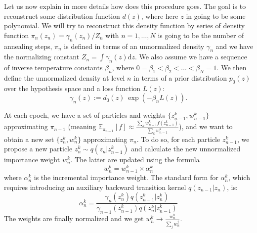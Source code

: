 \documentclass[11pt,a4paper]{article}
\begin{document}
		Let us now explain in more details how does this procedure goes. The goal is to reconstruct some distribution function $d(z)$, where here $z$ in going to be some polynomial. We will try to reconstruct this density function by series of density function $\pi_n(z_n) = \gamma_n(z_n)/Z_n$ with $n = 1,\dots,N$ is going to be the number of annealing steps, $\pi_n$ is defined in terms of an unnormalized density $\gamma_n$ and we have the normalizing constant $Z_n = \int \gamma_n(z) \mathrm{d}z$. We also assume we have a sequence of inverse temperature constants $\beta_n$, where $0 = \beta_1 < \beta_2 <\dots< \beta_N = 1$. We then define the unnormalized density at level $n$ in terms of a prior distribution $p_0(z)$ over the hypothesis space and a loss function $L(z)$:
		\begin{equation}\label{eq:gamman}
			\gamma_n(z) := d_0(z) \: \exp \left( -\beta_n L(z) \right).
		\end{equation} 
		
		At each epoch, we have a set of particles and weights $\{z_{n-1}^k, w_{n-1}^k\}$ approximating $\pi_{n-1}$ (meaning $\mathbb{E}_{\pi_{n-1}}[f] \approx \frac{\sum_k w_{n-1}^k f(z_{n-1}^k)}{\sum_k w_{n-1}^k}$), and we want to obtain a new set $\{z_n^k, w_n^k\}$ approximating $\pi_n$. To do so, for each particle $z^k_{n-1}$, we propose a new particle $z_n^k \sim q(z_n | z_{n-1}^k)$ and calculate the new unnormalized importance weight $w_n^k$. The latter are updated using the formula 
		\begin{equation}
			w_n^k = w_{n-1}^k \times \alpha_{n}^k
		\end{equation}
		where $\alpha_n^k$ is the incremental importance weight. The standard form for $\alpha_n^k$, which requires introducing an auxiliary backward transition kernel $q(z_{n-1} | z_n)$, is:
		\begin{equation}
			\alpha_n^k = \frac{ \gamma_n(z_n^k) q(z_{n-1}^k | z_n^k) }{ \gamma_{n-1}(z_{n-1}^k) q(z_n^k | z_{n-1}^k) } 
		\end{equation}
		The weights are finally normalized and we get $w_n^k \rightarrow \frac{w_n^k}{\sum_j w_n^j}$.
		
\end{document}
